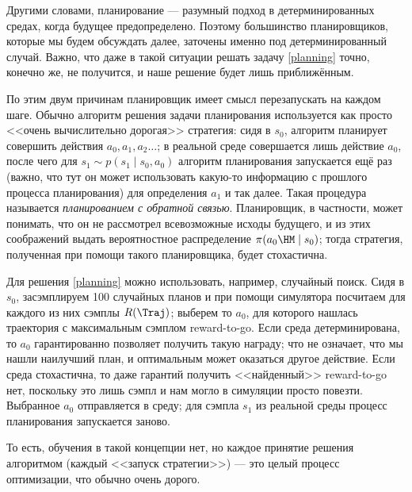 Другими словами, планирование --- разумный подход в детерминированных средах, когда будущее предопределено. Поэтому большинство планировщиков, которые мы будем обсуждать далее, заточены именно под детерминированный случай. Важно, что даже в такой ситуации решать задачу \eqref{planning} точно, конечно же, не получится, и наше решение будет лишь приближённым. 

По этим двум причинам планировщик имеет смысл перезапускать на каждом шаге. Обычно алгоритм решения задачи планирования используется как просто <<очень вычислительно дорогая>> стратегия: сидя в $s_0$, алгоритм планирует совершить действия $a_0, a_1, a_2 \dots$; в реальной среде совершается лишь действие $a_0$, после чего для $s_1 \sim p(s_1 \mid s_0, a_0)$ алгоритм планирования запускается ещё раз (важно, что тут он может использовать какую-то информацию с прошлого процесса планирования) для определения $a_1$ и так далее. Такая процедура называется \emph{планированием с обратной связью}. Планировщик, в частности, может понимать, что он не рассмотрел всевозможные исходы будущего, и из этих соображений выдать вероятностное распределение $\pi(a_0 \HM\mid s_0)$; тогда стратегия, полученная при помощи такого планировщика, будет стохастична.

\begin{example}
Для решения \eqref{planning} можно использовать, например, случайный поиск. Сидя в $s_0$, засэмплируем 100 случайных планов и при помощи симулятора посчитаем для каждого из них сэмплы $R(\Traj)$; выберем то $a_0$, для которого нашлась траектория с максимальным сэмплом reward-to-go. Если среда детерминирована, то $a_0$ гарантированно позволяет получить такую награду; что не означает, что мы нашли наилучший план, и оптимальным может оказаться другое действие. Если среда стохастична, то даже гарантий получить <<найденный>> reward-to-go нет, поскольку это лишь сэмпл и нам могло в симуляции просто повезти. Выбранное $a_0$ отправляется в среду; для сэмпла $s_1$ из реальной среды процесс планирования запускается заново. 


\end{example}

То есть, обучения в такой концепции нет, но каждое принятие решения алгоритмом (каждый <<запуск стратегии>>) --- это целый процесс оптимизации, что обычно очень дорого.

